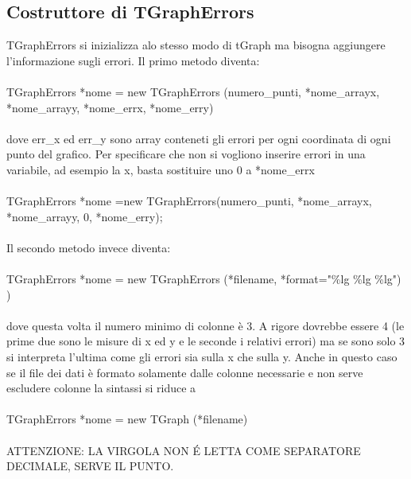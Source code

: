 \documentclass[10pt,a4paper]{article}
\begin{document}
\subsection{Costruttore di TGraphErrors}
TGraphErrors si inizializza alo stesso modo di tGraph ma bisogna aggiungere l'informazione sugli errori. Il primo metodo diventa:\\\\
TGraphErrors *nome = new TGraphErrors (numero\_punti, *nome\_arrayx, *nome\_arrayy, *nome\_errx, *nome\_erry)\\\\
dove err\_x ed err\_y sono array conteneti gli errori per ogni coordinata di ogni punto del grafico. Per specificare che non si vogliono inserire errori in una variabile, ad esempio la x, basta sostituire uno 0 a *nome\_errx\\\\
TGraphErrors *nome =new TGraphErrors(numero\_punti, *nome\_arrayx, *nome\_arrayy, 0, *nome\_erry);\\\\
Il secondo metodo invece diventa: \\\\
TGraphErrors *nome = new TGraphErrors (*filename, *format="\%lg \%lg \%lg") )\\\\
dove questa volta il numero minimo di colonne è 3. A rigore dovrebbe essere 4 (le prime due sono le misure di x ed y e le seconde i relativi errori) ma se sono solo 3 si interpreta l'ultima come gli errori sia sulla x che sulla y. Anche in questo caso se il file dei dati è formato solamente dalle colonne necessarie e non serve escludere colonne la sintassi si riduce a\\\\
TGraphErrors *nome = new TGraph (*filename)\\\\
ATTENZIONE: LA VIRGOLA NON \'{E} LETTA COME SEPARATORE DECIMALE, SERVE IL PUNTO. 
\end{document}

